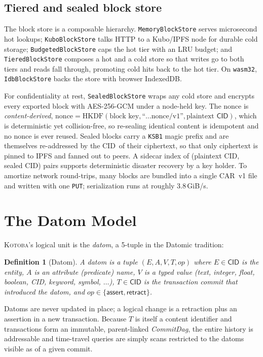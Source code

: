 \documentclass[11pt]{article}
\newtheorem{definition}{Definition}
\newcommand{\kotoba}{\textsc{Kotoba}}
\newcommand{\cid}{\textsf{CID}}
\begin{document}
\subsection{Tiered and sealed block store}
\label{sec:store}
The block store is a composable hierarchy. \texttt{MemoryBlockStore} serves
microsecond hot lookups; \texttt{KuboBlockStore} talks HTTP to a Kubo/IPFS node
for durable cold storage; \texttt{BudgetedBlockStore} caps the hot tier with an
LRU budget; and \texttt{TieredBlockStore} composes a hot and a cold store so that
writes go to both tiers and reads fall through, promoting cold hits back to the
hot tier. On \texttt{wasm32}, \texttt{IdbBlockStore} backs the store with
browser IndexedDB.

For confidentiality at rest, \texttt{SealedBlockStore} wraps any cold store and
encrypts every exported block with AES-256-GCM under a node-held key. The nonce
is \emph{content-derived}, $\mathrm{nonce}=\mathrm{HKDF}(\text{block key},
\text{``}\dots\text{nonce/v1''}, \text{plaintext }\cid)$, which is deterministic
yet collision-free, so re-sealing identical content is idempotent and no nonce is
ever reused. Sealed blocks carry a \texttt{KSB1} magic prefix and are themselves
re-addressed by the \cid\ of their ciphertext, so that only ciphertext is pinned
to IPFS and fanned out to peers. A sidecar index of (plaintext \cid, sealed \cid)
pairs supports deterministic disaster recovery by a key holder. To amortize
network round-trips, many blocks are bundled into a single CAR~v1 file and
written with one \texttt{PUT}; serialization runs at roughly $3.8$\,GiB/s.

\section{The Datom Model}
\label{sec:datom}

\kotoba's logical unit is the \emph{datom}, a 5-tuple in the Datomic tradition:
\begin{definition}[Datom]
A datom is a tuple $(E, A, V, T, \mathit{op})$ where $E\in\cid$ is the entity,
$A$ is an attribute (predicate) name, $V$ is a typed value (text, integer, float,
boolean, \cid, keyword, symbol, $\dots$), $T\in\cid$ is the transaction commit
that introduced the datom, and $\mathit{op}\in\{\textsf{assert},
\textsf{retract}\}$.
\end{definition}

Datoms are never updated in place; a logical change is a retraction plus an
assertion in a new transaction. Because $T$ is itself a content identifier and
transactions form an immutable, parent-linked \emph{CommitDag}, the entire
history is addressable and time-travel queries are simply scans restricted to the
datoms visible as of a given commit.
\end{document}
